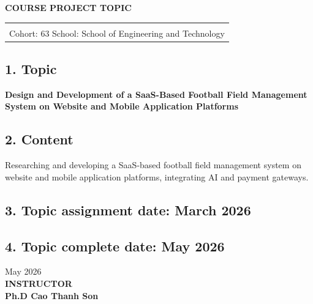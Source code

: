 \centerline{\textbf{\large COURSE PROJECT TOPIC}}

\begin{table}[htbp]
    \centering
    \begin{tabular}{l r}
    \fontsize{14pt}{0pt}\selectfont {Full name: Tran Duc Luong}    & \fontsize{14pt}{0pt}\selectfont {Student ID: 225748020110186}\\
    \multicolumn{2}{c}{Cohort: 63 \hspace{2.5cm} School: School of Engineering and Technology}
\end{tabular}
\end{table}
\subsection*{\textnormal{1. Topic}}
\textbf{Design and Development of a SaaS-Based Football Field Management System on Website and Mobile Application Platforms}

\subsection*{\textnormal{2. Content}}
Researching and developing a SaaS-based football field management system on website and mobile application platforms, integrating AI and payment gateways.

\subsection*{\textnormal{3. Topic assignment date: March 2026}}

\subsection*{\textnormal{4. Topic complete date: May 2026}}

\hspace{11cm} \textnormal{May 2026}\\
\hspace{11.1cm} \textbf{{INSTRUCTOR}}\\
\hspace{11.1cm} \textbf{{Ph.D Cao Thanh Son}}\\
\newpage